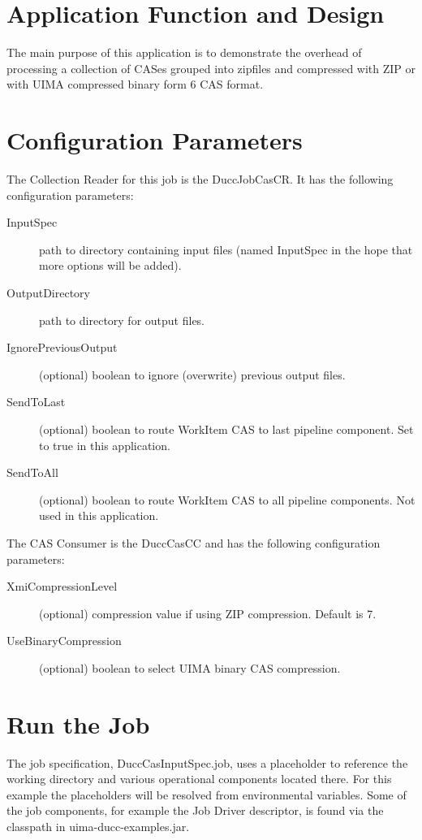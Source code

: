 \section{Application Function and Design}
The main purpose of this application is to demonstrate the overhead of processing a collection of CASes grouped into zipfiles 
and compressed with ZIP or with UIMA compressed binary form 6 CAS format.


\section{Configuration Parameters}
The Collection Reader for this job is the DuccJobCasCR. It has the following configuration
parameters:

\begin{description}
    \item[InputSpec] path to directory containing input files (named InputSpec in the hope that more options will be added).
    \item[OutputDirectory] path to directory for output files.
    \item[IgnorePreviousOutput] (optional) boolean to ignore (overwrite) previous output files.
    \item[SendToLast] (optional) boolean to route WorkItem CAS to last pipeline component. Set to true in this application.
    \item[SendToAll] (optional) boolean to route WorkItem CAS to all pipeline components. Not used in this application.
\end{description}


The CAS Consumer is the DuccCasCC and has the following configuration parameters:

\begin{description}
  \item[XmiCompressionLevel] (optional) compression value if using ZIP compression. Default is 7.
  \item[UseBinaryCompression] (optional) boolean to select UIMA binary CAS compression.
\end{description}

\section{Run the Job}
The job specification, DuccCasInputSpec.job, uses a placeholder to reference the working directory
and various operational components located there. For this example the placeholders will be resolved
from environmental variables. Some of the job components, for example
the Job Driver descriptor, is found via the classpath in uima-ducc-examples.jar.

